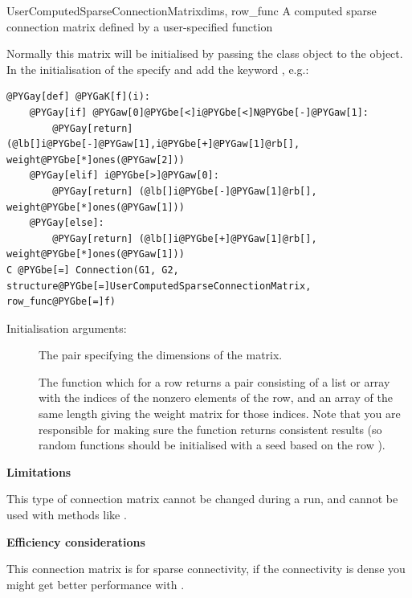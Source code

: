 \documentclass[letterpaper,10pt]{manual}
\begin{document}
\hypertarget{brian.UserComputedSparseConnectionMatrix}{}\begin{classdesc}{UserComputedSparseConnectionMatrix}{dims, row\_func}
A computed sparse connection matrix defined by a user-specified function

Normally this matrix will be initialised by passing the class
object to the \hyperlink{brian.Connection}{} object. In the initialisation
of the \hyperlink{brian.Connection}{} specify 
and add the keyword , e.g.:

\begin{Verbatim}[commandchars=@\[\]]
@PYGay[def] @PYGaK[f](i):
    @PYGay[if] @PYGaw[0]@PYGbe[<]i@PYGbe[<]N@PYGbe[-]@PYGaw[1]:
        @PYGay[return] (@lb[]i@PYGbe[-]@PYGaw[1],i@PYGbe[+]@PYGaw[1]@rb[], weight@PYGbe[*]ones(@PYGaw[2]))
    @PYGay[elif] i@PYGbe[>]@PYGaw[0]:
        @PYGay[return] (@lb[]i@PYGbe[-]@PYGaw[1]@rb[], weight@PYGbe[*]ones(@PYGaw[1]))
    @PYGay[else]:
        @PYGay[return] (@lb[]i@PYGbe[+]@PYGaw[1]@rb[], weight@PYGbe[*]ones(@PYGaw[1]))
C @PYGbe[=] Connection(G1, G2, structure@PYGbe[=]UserComputedSparseConnectionMatrix, row_func@PYGbe[=]f)
\end{Verbatim}

Initialisation arguments:
\begin{description}
\item[]
The pair  specifying the dimensions of the matrix.

\item[]
The function  which for a row  returns a pair 
consisting of a list or array  with the indices of the
nonzero elements of the row, and an array of the same length 
giving the weight matrix for those indices. Note that you are responsible
for making sure the function returns consistent results (so
random functions should be initialised with a seed based on
the row ).

\end{description}

\textbf{Limitations}

This type of connection matrix cannot be changed during a run, and
cannot be used with methods like .

\textbf{Efficiency considerations}

This connection matrix is for sparse connectivity, if the connectivity
is dense you might get better performance with \hyperlink{brian.UserComputedConnectionMatrix}{}.
\end{classdesc}
\end{document}
